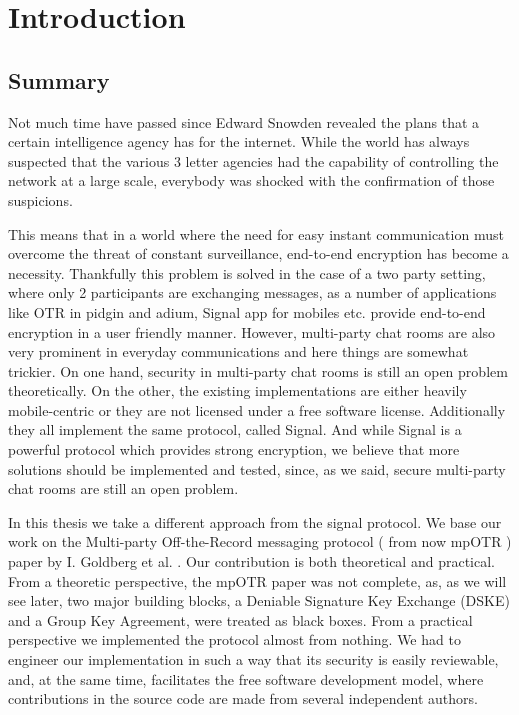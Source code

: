 \chapter{Introduction}

\label{chapter:introduction}

\newcommand{\dhname}{Diffie--Hellman }
\newcommand{\tdhname}{Triple Diffie--Hellman }



\section{Summary}

Not much time have passed since Edward Snowden revealed the plans that a certain intelligence agency has for the internet.
While the world has always suspected that the various 3 letter agencies had the capability of controlling the network at a large scale, everybody was shocked with the confirmation of those suspicions.

This means that in a world where the need for easy instant communication must overcome the threat of constant surveillance, end-to-end encryption has become a necessity.
Thankfully this problem is solved in the case of a two party setting, where only 2 participants are exchanging messages, as a number of applications like OTR in pidgin and adium, Signal app for mobiles etc. provide end-to-end encryption in a user friendly manner.
However, multi-party chat rooms are also very prominent in everyday communications and here things are somewhat trickier.
On one hand, security in multi-party chat rooms is still an open problem theoretically.
On the other, the existing implementations are either heavily mobile-centric or they are not licensed under a free software license.
Additionally they all implement the same protocol, called Signal.
And while Signal is a powerful protocol which provides strong encryption, we believe that more solutions should be implemented and tested, since, as we said, secure multi-party chat rooms are still an open problem.

In this thesis we take a different approach from the signal protocol.
We base our work on the Multi-party Off-the-Record messaging protocol ( from now mpOTR ) paper by I. Goldberg et al. \cite{mpotr}.
Our contribution is both theoretical and practical.
From a theoretic perspective, the mpOTR paper was not complete, as, as we will see later, two major building blocks, a Deniable Signature Key Exchange (DSKE) and a Group Key Agreement, were treated as black boxes.
From a practical perspective we implemented the protocol almost from nothing. We had to engineer our implementation in such a way that its security is easily reviewable, and, at the same time, facilitates the free software development model, where contributions in the source code are made from several independent authors.

